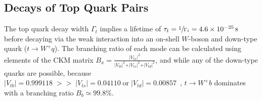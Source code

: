 \begin{refsection}
\section{Decays of Top Quark Pairs}
\label{Decays_of_Top_Quark_Pairs}
The top quark decay width $\Gamma_t$ implies a lifetime of $\tau_t = \sfrac{1}{\Gamma_t}=\SI{4.6e-25}{\s}$ before decaying via the weak interaction into an on-shell $W$-boson and down-type quark ($t \rightarrow W^+ q$).
The branching ratio of each mode can be calculated using elements of the CKM matrix $B_x = \frac{\vert V_{tx} \vert^2}{\vert V_{tb} \vert^2 + \vert V_{ts} \vert^2 + \vert V_{td} \vert^2}$, and while any of the down-type quarks are possible, because $\vert V_{tb} \vert = 0.999118 \; >> \; \vert V_{ts} \vert = 0.04110 \; \text{or} \; \vert V_{td} \vert = 0.00857$~\cite{bib:PDG}, $t \rightarrow W^+ b$ dominates with a branching ratio $ B_b \simeq 99.8\%$.


\end{refsection}
